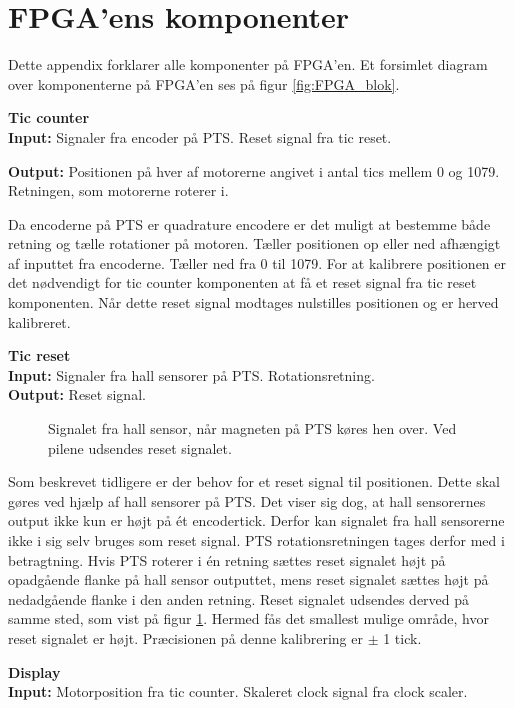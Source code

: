 \section{FPGA'ens komponenter}
\label{sec:fpgaappendix}
Dette appendix forklarer alle komponenter på FPGA'en.
Et forsimlet diagram over komponenterne på FPGA'en ses på figur \ref{fig:FPGA_blok}.


\textbf{Tic counter}\\
\textbf{Input:}
Signaler fra encoder på PTS. Reset signal fra tic reset.

\textbf{Output:} Positionen på hver af motorerne angivet i antal tics mellem 0 
og 1079. Retningen, som motorerne roterer i. 

Da encoderne på PTS er quadrature encodere er det muligt at bestemme både retning og 
tælle rotationer på motoren.
Tæller positionen op eller ned afhængigt af inputtet fra encoderne. 
Tæller ned fra 0 til 1079.
For at kalibrere positionen er det nødvendigt for tic counter komponenten at få 
et reset signal fra tic reset komponenten. 
Når dette reset signal modtages nulstilles positionen og er herved kalibreret.

\textbf{Tic reset}\\
\textbf{Input:} Signaler fra hall sensorer på PTS. Rotationsretning.\\
\textbf{Output:} Reset signal.

\begin{figure}[!th]
\centering

\caption[Signal fra hall sensor]{Signalet fra hall sensor, når magneten på PTS køres hen over. Ved pilene udsendes reset signalet.}
\label{fig:hall_sensor_signal}
\end{figure}

Som beskrevet tidligere er der behov for et reset signal til positionen. 
Dette skal gøres ved hjælp af hall sensorer på PTS. 
Det viser sig dog, at hall sensorernes output ikke kun er højt på ét encodertick. 
Derfor kan signalet fra hall sensorerne ikke i sig selv bruges som reset signal.
PTS rotationsretningen tages derfor med i betragtning.
Hvis PTS roterer i én retning sættes reset signalet højt på opadgående 
flanke på hall sensor outputtet, mens reset signalet sættes højt på nedadgående 
flanke i den anden retning. Reset signalet udsendes derved på samme sted, som vist på figur \ref{fig:hall_sensor_signal}.
Hermed fås det smallest mulige område, hvor reset signalet er højt.
Præcisionen på denne kalibrering er $\pm$ 1 tick.

\textbf{Display}\\
\textbf{Input:} Motorposition fra tic counter. Skaleret clock signal fra clock 
scaler.

